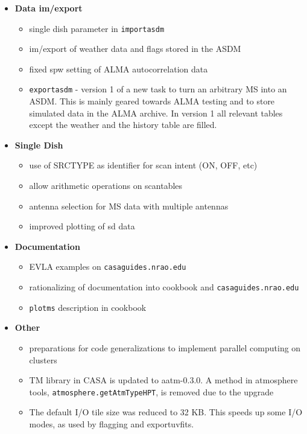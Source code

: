 \begin{itemize}
\item {\bf Data im/export}
     \begin{itemize}
       \item single dish parameter in {\tt importasdm}
       \item im/export of weather data and flags stored in the ASDM
         \item fixed spw setting of ALMA autocorrelation data
     \item {\tt exportasdm} - version 1 of a new task to turn an arbitrary MS into an ASDM. This is mainly
                     geared towards  ALMA testing and to store simulated data in the ALMA archive.
                    In version 1 all relevant tables except the weather and the history table are filled.
       \end{itemize}

\item {\bf Single Dish}
  \begin{itemize}
    \item use of SRCTYPE as identifier for scan intent (ON, OFF, etc)
      \item allow arithmetic operations on scantables
        \item antenna selection for MS data with multiple antennas
          \item improved plotting of sd data
    \end{itemize}

\item {\bf Documentation}
  \begin{itemize}
    \item EVLA examples on {\tt casaguides.nrao.edu}
    \item rationalizing of documentation into cookbook and
      {\tt casaguides.nrao.edu}
      \item {\tt plotms} description in cookbook
   \end{itemize} 

\item {\bf Other}
  \begin{itemize}
    \item preparations for  code generalizations to implement parallel
      computing on clusters 
    \item TM library in CASA is updated to aatm-0.3.0. A method in
   atmosphere tools, {\tt atmosphere.getAtmTypeHPT}, is removed
   due to the upgrade
   \item The default I/O tile size was reduced to 32 KB. This speeds up some I/O modes, as used by flagging and exportuvfits.
  \end{itemize}



\end{itemize}


